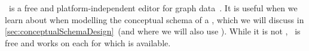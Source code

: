 %
%
\label{sec:installingYed}%
%
\yEd\ is a free and platform-independent editor for graph data~\cite{SG2015MDAWY,Y2011YGEM}.
It is useful when we learn about  when modelling the conceptual schema of a \db, which we will discuss in \cref{sec:conceptualSchemaDesign}~(and where we will also use \yEd).
While it is not , \yEd\ is free and works on each  for which  is available.%
%
%
%
%
\endhsection%
%

